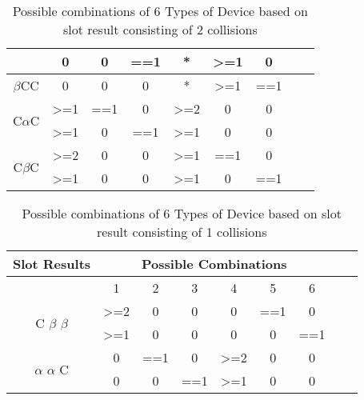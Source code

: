 \documentclass[fleqn]{article}
\begin{document}
\begin {table} [h]
\begin{tabular}{|c|c|c|c|c|c|c|c|c|}
                            & 0                & 0                & ==1 & *                & \textgreater{}=1 & 0   \\ \hline
$\beta$CC                   & 0                & 0                & 0   & *                & \textgreater{}=1 & ==1 \\ \hline
\multirow{2}{*}{C$\alpha$C} & \textgreater{}=1 & ==1              & 0   & \textgreater{}=2 & 0                & 0   \\ \cline{2-7} 
                            & \textgreater{}=1 & 0                & ==1 & \textgreater{}=1 & 0                & 0   \\ \hline
\multirow{2}{*}{C$\beta$C}  & \textgreater{}=2 & 0                & 0   & \textgreater{}=1 & ==1              & 0   \\ \cline{2-7} 
                            & \textgreater{}=1 & 0                & 0   & \textgreater{}=1 & 0                & ==1 \\ \hline

\end{tabular}

\caption{Possible combinations of 6 Types of Device based on slot result consisting of 2 collisions}
\label{Tab8_3C}
\end{table}

\begin{table}[h!]
\centering
\begin{tabular}{|c|c|c|c|c|c|c|c|c|}
\hline
Slot Results & \multicolumn{6}{c|}{Possible Combinations} \\ \hline
 & 1 & 2 & 3 & 4 & 5 & 6 \\ \hline
\multirow{2}{*}{C $\beta$ $\beta$} & \textgreater{}=2 & 0 & 0 & 0 & ==1 & 0 \\ \cline{2-7} 
 & \textgreater{}=1 & 0 & 0 & 0 & 0 & ==1 \\ \hline
\multirow{2}{*}{$\alpha$ $\alpha$ C} & 0 & ==1 & 0 & \textgreater{}=2 & 0 & 0 \\ \cline{2-7} 
 & 0 & 0 & ==1 & \textgreater{}=1 & 0 & 0 \\ \hline
\end{tabular}
\caption{Possible combinations of 6 Types of Device based on slot result consisting of 1 collisions}
\label{Tab8_2C}
\end{table}
\end{document}
